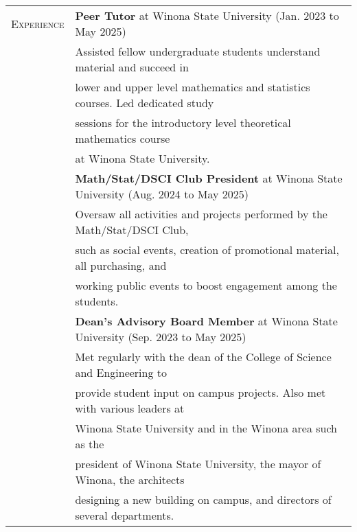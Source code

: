\documentclass{article}
\begin{document}
\begin{tabular}{l l}
\textsc{Experience} & \textbf{Peer Tutor} at Winona State University (Jan. 2023 to May 2025)\\
					& \hspace{10mm} Assisted fellow undergraduate students understand material and succeed in \\
					& \hspace{2.5mm}lower and upper level mathematics and statistics courses. Led dedicated study\\ 
					& \hspace{2.5mm}sessions for the introductory level theoretical mathematics course \\
					& \hspace{2.5mm}at Winona State University.\\
					
					& \textbf{Math/Stat/DSCI Club President} at Winona State University (Aug. 2024 to May 2025)\\
					& \hspace{10mm} Oversaw all activities and projects performed by the Math/Stat/DSCI Club, \\
					& \hspace{2.5mm} such as social events, creation of promotional material, all purchasing, and\\
					& \hspace{2.5mm} working public events to boost engagement among the students. \\
					
					& \textbf{Dean's Advisory Board Member} at Winona State University (Sep. 2023 to May 2025) \\
					& \hspace{10mm} Met regularly with the dean of the College of Science and Engineering to \\
					& \hspace{2.5mm} provide student input on campus projects. Also met with various leaders at \\
					& \hspace{2.5mm} Winona State University and in the Winona area such as the \\
					& \hspace{2.5mm} president of Winona State University, the mayor of Winona, the architects \\
					& \hspace{2.5mm} designing a new building on campus, and directors of several departments. \\
\end{tabular}
\end{document}

